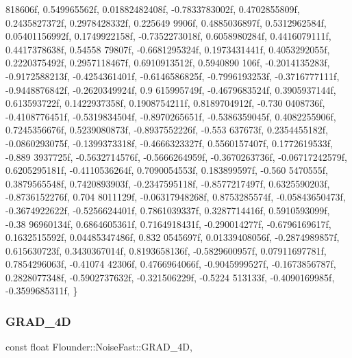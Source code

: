 \begin{DoxyCode}
      818606f, 0.549965562f, 0.01882482408f, -0.7833783002f, 0.4702855809f, 0.2435827372f, 0.2978428332f, 0.225649
      9906f, 0.4885036897f, 0.5312962584f,
        0.05401156992f, 0.1749922158f, -0.7352273018f, 0.6058980284f, 0.4416079111f, 0.4417378638f, 0.54558
      79807f, -0.6681295324f, 0.1973431441f, 0.4053292055f, 0.2220375492f, 0.2957118467f, 0.6910913512f, 0.5940890
      106f, -0.2014135283f, -0.9172588213f,
        -0.4254361401f, -0.6146586825f, -0.7996193253f, -0.3716777111f, -0.9448876842f, -0.2620349924f, 0.9
      615995749f, -0.4679683524f, 0.3905937144f, 0.613593722f, 0.1422937358f, 0.1908754211f, 0.8189704912f, -0.730
      0408736f, -0.4108776451f, -0.5319834504f,
        -0.8970265651f, -0.5386359045f, 0.4082255906f, 0.7245356676f, 0.5239080873f, -0.8937552226f, -0.553
      637673f, 0.2354455182f, -0.0860293075f, -0.1399373318f, -0.4666323327f, 0.5560157407f, 0.1772619533f, -0.889
      3937725f, -0.5632714576f, -0.5666264959f,
        -0.3670263736f, -0.06717242579f, 0.6205295181f, -0.4110536264f, 0.7090054553f, 0.183899597f, -0.560
      5470555f, 0.3879565548f, 0.7420893903f, -0.2347595118f, -0.8577217497f, 0.6325590203f, -0.8736152276f, 0.704
      8011129f, -0.06317948268f, 0.8753285574f,
        -0.05843650473f, -0.3674922622f, -0.5256624401f, 0.7861039337f, 0.3287714416f, 0.5910593099f, -0.38
      96960134f, 0.6864605361f, 0.7164918431f, -0.290014277f, -0.6796169617f, 0.1632515592f, 0.04485347486f, 0.832
      0545697f, 0.01339408056f, -0.2874989857f,
        0.615630723f, 0.3430367014f, 0.8193658136f, -0.5829600957f, 0.07911697781f, 0.7854296063f, -0.41074
      42306f, 0.4766964066f, -0.9045999527f, -0.1673856787f, 0.2828077348f, -0.5902737632f, -0.321506229f, -0.5224
      513133f, -0.4090169985f, -0.3599685311f,
    \}
\end{DoxyCode}
\mbox{\label{class_flounder_1_1_noise_fast_af769860a883edc07dcbac41f06bc5d4a}} 
\subsubsection{\texorpdfstring{G\+R\+A\+D\+\_\+4D}{GRAD\_4D}}
{\footnotesize\ttfamily const float Flounder\+::\+Noise\+Fast\+::\+G\+R\+A\+D\+\_\+4D\hspace{0.3cm}{\ttfamily [static]}, {\ttfamily [private]}}

